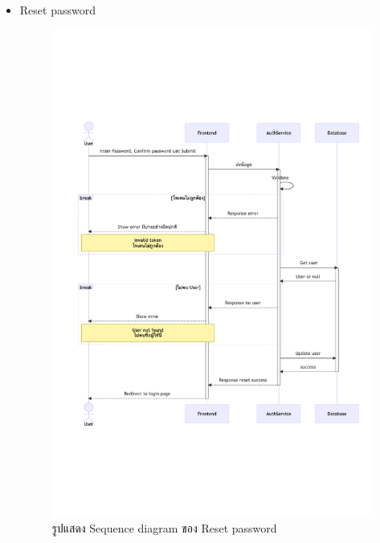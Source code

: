 \documentclass[12pt,oneside,openright,a4paper]{cpe-thai-project}
\begin{document}
\begin{itemize}
    
    \newpage
    \item Reset password \\
    \begin{figure}[!ht]\centering
        \includegraphics[width=13cm, trim={0 7cm 0 7cm},clip]{./assets/sequence-diagram/reset-password.png}
        \caption{รูปแสดง Sequence diagram ของ Reset password}\label{fig:sqResetPassword}
    \end{figure}


\end{itemize}
\end{document}
